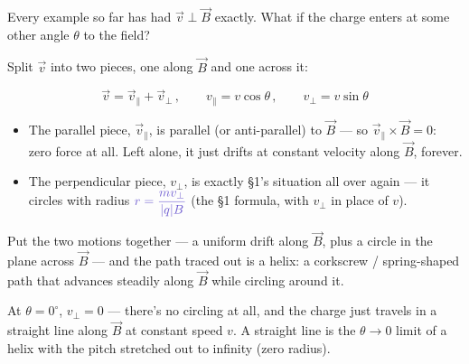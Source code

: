 \documentclass[12pt]{article}
\newcommand{\ANS}[1]{\textcolor{accent}{#1}}
\begin{document}

Every example so far has had $\vec v\perp\vec B$ exactly. What if the charge
enters at some other angle $\theta$ to the field?

Split $\vec v$ into two pieces, one along $\vec B$ and one across it:

\[
\vec v = \vec v_\parallel + \vec v_\perp\,, \qquad
v_\parallel = v\cos\theta\,, \qquad v_\perp = v\sin\theta
\]

\begin{center}
\end{center}

\begin{itemize}[itemsep=6pt,parsep=3pt,topsep=3pt]
\item The parallel piece, $\vec v_\parallel$, is \ANS{parallel (or
anti-parallel)} to $\vec B$ --- so $\vec v_\parallel\times\vec B=0$:
\ANS{zero} force at all. Left alone, it just \ANS{drifts at constant
velocity along $\vec B$, forever}.
\item The perpendicular piece, $v_\perp$, is exactly \S1's situation all
over again --- it circles with radius $\ANS{r=\dfrac{mv_\perp}{|q|B}}$ (the
\S1 formula, with $v_\perp$ in place of $v$).
\end{itemize}

Put the two motions together --- a uniform drift along $\vec B$, plus a
circle in the plane across $\vec B$ --- and the path traced out is a
\ANS{helix}: a \ANS{corkscrew / spring-shaped path that advances steadily
along $\vec B$ while circling around it}.


{\small\color{accent} At $\theta=0^\circ$, $v_\perp=0$ --- there's no
circling at all, and the charge just travels in a straight line along
$\vec B$ at constant speed $v$. A straight line is the $\theta\to0$ limit of
a helix with the pitch stretched out to infinity (zero radius).}
\end{document}

